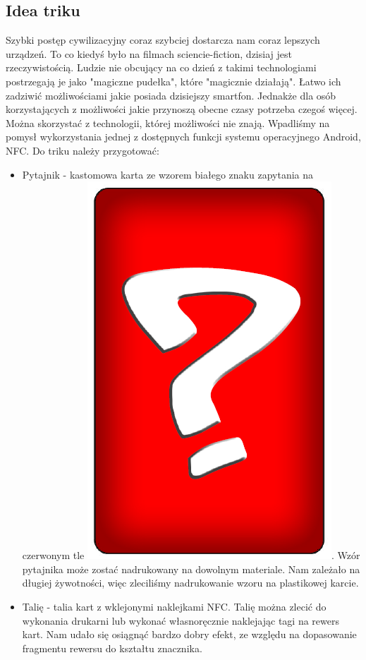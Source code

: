 \documentclass{article}
\numberwithin{equation}{section}
\begin{document}
\subsection{Idea triku}
Szybki postęp cywilizacyjny coraz szybciej dostarcza nam coraz lepszych urządzeń. To co kiedyś było na filmach sciencie-fiction, dzisiaj jest rzeczywistością. Ludzie nie obcujący na co dzień z takimi technologiami postrzegają je jako "magiczne pudełka", które "magicznie działają". Łatwo ich zadziwić możliwościami jakie posiada dzisiejszy smartfon. Jednakże dla osób korzystających z możliwości jakie przynoszą obecne czasy potrzeba czegoś więcej. Można skorzystać z technologii, której możliwości nie znają. Wpadliśmy na pomysł wykorzystania jednej z dostępnych funkcji systemu operacyjnego Android, NFC. Do triku należy przygotować:
\begin{itemize}
    \item Pytajnik - kastomowa karta ze wzorem białego znaku zapytania na czerwonym tle
\includegraphics[scale=0.04]{pytajnik.PNG}. Wzór pytajnika może zostać nadrukowany na dowolnym materiale. Nam zależało na długiej żywotności, więc zleciliśmy nadrukowanie wzoru na plastikowej karcie.
    \item Talię - talia kart z wklejonymi naklejkami NFC. Talię można zlecić do wykonania drukarni lub wykonać własnoręcznie naklejając tagi na rewers kart. Nam udało się osiągnąć bardzo dobry efekt, ze względu na dopasowanie fragmentu rewersu do kształtu znacznika.

\end{itemize}
\end{document}
